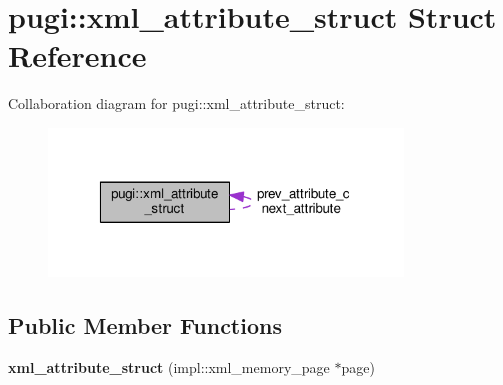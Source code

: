 \hypertarget{structpugi_1_1xml__attribute__struct}{\section{pugi\+:\+:xml\+\_\+attribute\+\_\+struct Struct Reference}
\label{structpugi_1_1xml__attribute__struct}
}


Collaboration diagram for pugi\+:\+:xml\+\_\+attribute\+\_\+struct\+:
\nopagebreak
\begin{figure}[H]
\begin{center}
\leavevmode
\includegraphics[width=267pt]{structpugi_1_1xml__attribute__struct__coll__graph}
\end{center}
\end{figure}
\subsection*{Public Member Functions}
\begin{DoxyCompactItemize}
\item 
\hypertarget{structpugi_1_1xml__attribute__struct_a57bb21cb72613e746a659efdd6425b94}{{\bfseries xml\+\_\+attribute\+\_\+struct} (impl\+::xml\+\_\+memory\+\_\+page $\ast$page)}\label{structpugi_1_1xml__attribute__struct_a57bb21cb72613e746a659efdd6425b94}

\end{DoxyCompactItemize}
